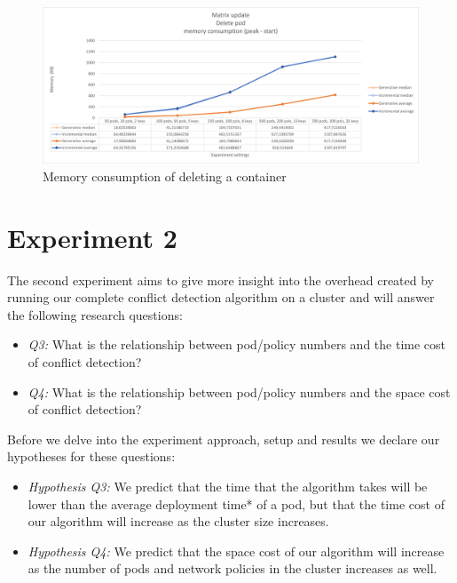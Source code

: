 \begin{figure}[H]
    \centering
    \includegraphics[width=\textwidth]{images/experiment1/delPod-memory.png}
    \caption{Memory consumption of deleting a container}
    \label{fig:exp1-delPod-memory}
\end{figure}



\section{Experiment 2}\label{sec:experiment2}
The second experiment aims to give more insight into the overhead created by running our complete conflict detection algorithm on a cluster and will answer the following research questions:

\begin{itemize}
    \item \textit{Q3:} What is the relationship between pod/policy numbers and the time cost of conflict detection?
    \item \textit{Q4:} What is the relationship between pod/policy numbers and the space cost of conflict detection?
\end{itemize}

Before we delve into the experiment approach, setup and results we declare our hypotheses for these questions:

\begin{itemize}
    \item \textit{Hypothesis Q3:} We predict that the time that the algorithm takes will be lower than the average deployment time* of a pod, but that the time cost of our algorithm will increase as the cluster size increases.
    \item \textit{Hypothesis Q4:} We predict that the space cost of our algorithm will increase as the number of pods and network policies in the cluster increases as well.
\end{itemize}

